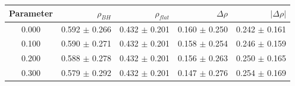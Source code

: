 \begin{tabular}{c r r r r}
\toprule
Parameter & $\rho_{BH}$ & $\rho_{flat}$ & $\Delta\rho$ & $|\Delta\rho|$ \\
\midrule
0.000 & 0.592 $\pm$ 0.266 & 0.432 $\pm$ 0.201 & 0.160 $\pm$ 0.250 & 0.242 $\pm$ 0.161 \\
0.100 & 0.590 $\pm$ 0.271 & 0.432 $\pm$ 0.201 & 0.158 $\pm$ 0.254 & 0.246 $\pm$ 0.159 \\
0.200 & 0.588 $\pm$ 0.278 & 0.432 $\pm$ 0.201 & 0.156 $\pm$ 0.263 & 0.250 $\pm$ 0.165 \\
0.300 & 0.579 $\pm$ 0.292 & 0.432 $\pm$ 0.201 & 0.147 $\pm$ 0.276 & 0.254 $\pm$ 0.169 \\
\bottomrule
\end{tabular}